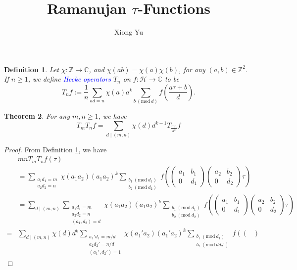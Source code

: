 \documentclass{article}
\newtheorem{theorem}{Theorem}
\newtheorem{definition}[theorem]{Definition}
\newcommand{\Mod}[1]{\ (\mathrm{mod}\ #1)}
\begin{document}
\title{Ramanujan $\tau$-Functions}
\author{Xiong Yu}
\maketitle
\begin{definition}\label{def 1}
    Let $\chi:\mathbb{Z}\to\mathbb{C}$, and $\chi(ab)=\chi(a)\chi(b)$, for any $(a,b)\in \mathbb{Z}^2$. If $n\geq 1$, we define \textcolor{blue}{Hecke operators} $T_n$ on $f:\mathcal{H}\to \mathbb{C}$ to be
    \[T_nf:=\frac{1}{n}\sum_{ad=n}\chi(a)a^k\sum_{b\Mod{d}}f(\frac{a\tau+b}{d}).\]
\end{definition}
\begin{theorem}
    For any $m,n\geq 1$, we have \[T_mT_nf=\sum_{d\mid (m,n)}\chi(d)d^{k-1}T_{\frac{mn}{d^2}}f\]
\end{theorem}
\begin{proof}
    From Definition \ref{def 1}, we have 
    \begin{equation}\label{eqn 1}
        \begin{aligned}
            &mnT_mT_nf(\tau)\\
            &=\sum_{\substack{a_1d_1=m\\a_2d_2=n}}\chi(a_1a_2)(a_1a_2)^k \sum_{\substack{b_1\Mod{d_1}\\b_2\Mod{d_2}}}f\left(\begin{pmatrix}
            a_1&b_1\\
            0&d_1
        \end{pmatrix}
        \begin{pmatrix}
            a_2&b_2\\
            0&d_2
        \end{pmatrix}\tau\right)\\
        &=\sum_{d\mid (m,n)}\sum_{\substack{a_1d_1=m\\a_2d_2=n\\(a_1,d_2)=d}}\chi(a_1a_2)(a_1a_2)^k \sum_{\substack{b_1\Mod{d_1}\\b_2\Mod{d_2}}}f\left(\begin{pmatrix}
            a_1&b_1\\
            0&d_1
        \end{pmatrix}
        \begin{pmatrix}
            a_2&b_2\\
            0&d_2
        \end{pmatrix}\tau\right)\\
        =&\sum_{d\mid (m,n)}\chi(d)d^k\sum_{\substack{a_1'd_1=m/d\\a_2d_2'=n/d\\(a_1',d_2')=1}}\chi(a_1'a_2)(a_1'a_2)^k \sum_{\substack{b_1\Mod{d_1}\\b_2\Mod{d d_2'}}}f\left(\begin{pmatrix}

\end{pmatrix}
\end{aligned}
\end{equation}
\end{proof}
\end{document}
